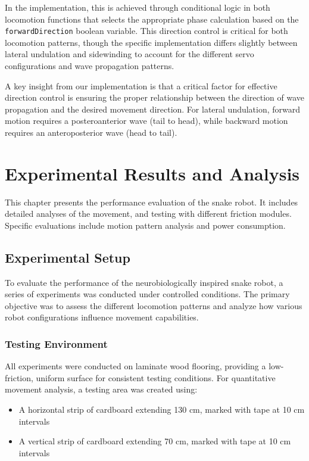 \documentclass[12pt,a4paper]{report}
\begin{document}
In the implementation, this is achieved through conditional logic in both locomotion functions that selects the appropriate phase calculation based on the \texttt{forwardDirection} boolean variable. This direction control is critical for both locomotion patterns, though the specific implementation differs slightly between lateral undulation and sidewinding to account for the different servo configurations and wave propagation patterns.

A key insight from our implementation is that a critical factor for effective direction control is ensuring the proper relationship between the direction of wave propagation and the desired movement direction. For lateral undulation, forward motion requires a posteroanterior wave (tail to head), while backward motion requires an anteroposterior wave (head to tail).
\chapter{Experimental Results and Analysis}
This chapter presents the performance evaluation of the snake robot. It includes detailed analyses of the movement, and testing with different friction modules. Specific evaluations include motion pattern analysis and power consumption.

\section{Experimental Setup}
To evaluate the performance of the neurobiologically inspired snake robot, a series of experiments was conducted under controlled conditions. The primary objective was to assess the different locomotion patterns and analyze how various robot configurations influence movement capabilities.

\subsection{Testing Environment}
All experiments were conducted on laminate wood flooring, providing a low-friction, uniform surface for consistent testing conditions. For quantitative movement analysis, a testing area was created using:
\begin{itemize}
    \item A horizontal strip of cardboard extending 130 cm, marked with tape at 10 cm intervals
    \item A vertical strip of cardboard extending 70 cm, marked with tape at 10 cm intervals
\end{itemize}
\end{document}

